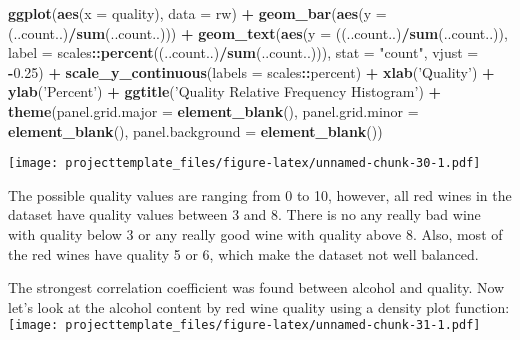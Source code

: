 \documentclass[]{article}
\newenvironment{Shaded}{\begin{snugshade}}{\end{snugshade}}
\newcommand{\KeywordTok}[1]{\textcolor[rgb]{0.13,0.29,0.53}{\textbf{#1}}}
\newcommand{\DataTypeTok}[1]{\textcolor[rgb]{0.13,0.29,0.53}{#1}}
\newcommand{\FloatTok}[1]{\textcolor[rgb]{0.00,0.00,0.81}{#1}}
\newcommand{\StringTok}[1]{\textcolor[rgb]{0.31,0.60,0.02}{#1}}
\newcommand{\OperatorTok}[1]{\textcolor[rgb]{0.81,0.36,0.00}{\textbf{#1}}}
\newcommand{\NormalTok}[1]{#1}
\begin{document}
\begin{Shaded}
\begin{Highlighting}[]
\KeywordTok{ggplot}\NormalTok{(}\KeywordTok{aes}\NormalTok{(}\DataTypeTok{x =}\NormalTok{ quality), }\DataTypeTok{data =}\NormalTok{ rw) }\OperatorTok{+}\StringTok{ }
\StringTok{  }\KeywordTok{geom_bar}\NormalTok{(}\KeywordTok{aes}\NormalTok{(}\DataTypeTok{y =}\NormalTok{ (..count..)}\OperatorTok{/}\KeywordTok{sum}\NormalTok{(..count..))) }\OperatorTok{+}
\StringTok{  }\KeywordTok{geom_text}\NormalTok{(}\KeywordTok{aes}\NormalTok{(}\DataTypeTok{y =}\NormalTok{ ((..count..)}\OperatorTok{/}\KeywordTok{sum}\NormalTok{(..count..)), }
            \DataTypeTok{label =}\NormalTok{ scales}\OperatorTok{::}\KeywordTok{percent}\NormalTok{((..count..)}\OperatorTok{/}\KeywordTok{sum}\NormalTok{(..count..))), }
            \DataTypeTok{stat =} \StringTok{"count"}\NormalTok{, }
            \DataTypeTok{vjust =} \OperatorTok{-}\FloatTok{0.25}\NormalTok{) }\OperatorTok{+}
\StringTok{  }\KeywordTok{scale_y_continuous}\NormalTok{(}\DataTypeTok{labels =}\NormalTok{ scales}\OperatorTok{::}\NormalTok{percent) }\OperatorTok{+}\StringTok{ }
\StringTok{  }\KeywordTok{xlab}\NormalTok{(}\StringTok{'Quality'}\NormalTok{) }\OperatorTok{+}\StringTok{ }
\StringTok{  }\KeywordTok{ylab}\NormalTok{(}\StringTok{'Percent'}\NormalTok{) }\OperatorTok{+}\StringTok{ }
\StringTok{  }\KeywordTok{ggtitle}\NormalTok{(}\StringTok{'Quality Relative Frequency Histogram'}\NormalTok{) }\OperatorTok{+}
\StringTok{  }\KeywordTok{theme}\NormalTok{(}\DataTypeTok{panel.grid.major =} \KeywordTok{element_blank}\NormalTok{(), }
        \DataTypeTok{panel.grid.minor =} \KeywordTok{element_blank}\NormalTok{(),}
        \DataTypeTok{panel.background =} \KeywordTok{element_blank}\NormalTok{())}
\end{Highlighting}
\end{Shaded}

\texttt{[image: projecttemplate\_files/figure-latex/unnamed-chunk-30-1.pdf]}

The possible quality values are ranging from 0 to 10, however, all red
wines in the dataset have quality values between 3 and 8. There is no
any really bad wine with quality below 3 or any really good wine with
quality above 8. Also, most of the red wines have quality 5 or 6, which
make the dataset not well balanced.

The strongest correlation coefficient was found between alcohol and
quality. Now let's look at the alcohol content by red wine quality using
a density plot function:
\texttt{[image: projecttemplate\_files/figure-latex/unnamed-chunk-31-1.pdf]}
\end{document}
